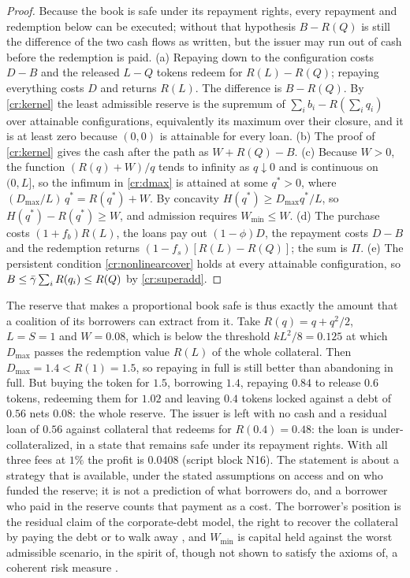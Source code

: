 \begin{proof}
Because the book is safe under its repayment rights, every repayment and redemption below can be executed; without that hypothesis $B-R(Q)$ is still the difference of the two cash flows as written, but the issuer may run out of cash before the redemption is paid. (a) Repaying down to the configuration costs $D-B$ and the released $L-Q$ tokens redeem for $R(L)-R(Q)$; repaying everything costs $D$ and returns $R(L)$. The difference is $B-R(Q)$. By \cref{cr:kernel} the least admissible reserve is the supremum of $\sum_ib_i-R(\sum_iq_i)$ over attainable configurations, equivalently its maximum over their closure, and it is at least zero because $(0,0)$ is attainable for every loan. (b) The proof of \cref{cr:kernel} gives the cash after the path as $W+R(Q)-B$. (c) Because $W>0$, the function $(R(q)+W)/q$ tends to infinity as $q\downarrow0$ and is continuous on $(0,L]$, so the infimum in \eqref{cr:dmax} is attained at some $q^\ast>0$, where $(D_{\max}/L)\,q^\ast=R(q^\ast)+W$. By concavity $H(q^\ast)\ge D_{\max}q^\ast/L$, so $H(q^\ast)-R(q^\ast)\ge W$, and admission requires $W_{\min}\le W$. (d) The purchase costs $(1+f_b)R(L)$, the loans pay out $(1-\phi)D$, the repayment costs $D-B$ and the redemption returns $(1-f_s)[R(L)-R(Q)]$; the sum is $\Pi$. (e) The persistent condition \eqref{cr:nonlinearcover} holds at every attainable configuration, so $B\le\bar\gamma\sum_iR(q_i)\le R(Q)$ by \eqref{cr:superadd}.
\end{proof}

The reserve that makes a proportional book safe is thus exactly the amount that a coalition of its borrowers can extract from it. Take $R(q)=q+q^2/2$, $L=S=1$ and $W=0.08$, which is below the threshold $kL^2/8=0.125$ at which $D_{\max}$ passes the redemption value $R(L)$ of the whole collateral. Then $D_{\max}=1.4<R(1)=1.5$, so repaying in full is still better than abandoning in full. But buying the token for $1.5$, borrowing $1.4$, repaying $0.84$ to release $0.6$ tokens, redeeming them for $1.02$ and leaving $0.4$ tokens locked against a debt of $0.56$ nets $0.08$: the whole reserve. The issuer is left with no cash and a residual loan of $0.56$ against collateral that redeems for $R(0.4)=0.48$: the loan is under-collateralized, in a state that remains safe under its repayment rights. With all three fees at $1\%$ the profit is $0.0408$ (script block N16). The statement is about a strategy that is available, under the stated assumptions on access and on who funded the reserve; it is not a prediction of what borrowers do, and a borrower who paid in the reserve counts that payment as a cost. The borrower's position is the residual claim of the corporate-debt model, the right to recover the collateral by paying the debt or to walk away \citep{merton1974}, and $W_{\min}$ is capital held against the worst admissible scenario, in the spirit of, though not shown to satisfy the axioms of, a coherent risk measure \citep{artzner1999}.

